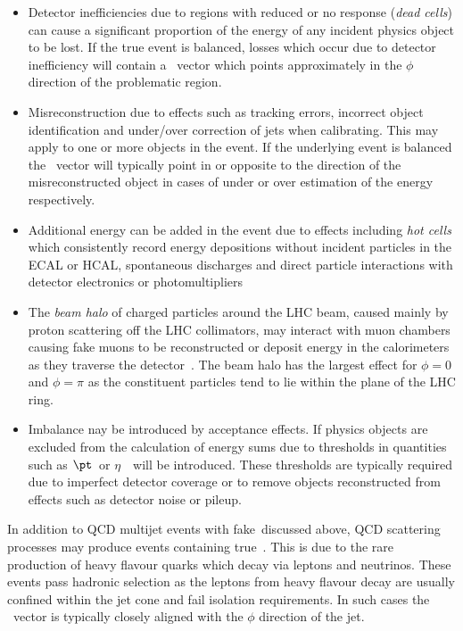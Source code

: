 \begin{itemize}
\item Detector inefficiencies due to regions with reduced or no response (\emph{dead cells}) can cause 
a significant proportion of the energy of any incident physics object to be lost. If the true event 
is balanced, losses which occur due to detector inefficiency will contain a \met~vector which points 
approximately in the $\phi$ direction of the problematic region.
\item Misreconstruction due to effects such as tracking errors, incorrect object identification and
under/over correction of jets when calibrating. This may apply to one or more objects in the event. 
If the underlying event is balanced the \met~vector will typically point in or opposite to the direction 
of the misreconstructed object in cases of under or over estimation of the energy respectively.
\item Additional energy can be added in the event due to effects including \emph{hot cells} which 
consistently record energy depositions without incident particles in the ECAL or HCAL, 
spontaneous discharges and direct particle interactions with detector
electronics or photomultipliers
\item The \emph{beam halo} of charged particles around the LHC beam, caused mainly 
by proton scattering off the LHC collimators, may interact with muon chambers causing fake muons to be 
reconstructed or deposit energy in the calorimeters as they traverse the detector~\cite{beam_halo}. The beam halo has the largest 
effect for $\phi = 0$ and $\phi=\pi$ as the constituent particles tend to lie within the plane of the LHC ring.
\item Imbalance nay be introduced by acceptance effects. If physics objects are excluded from the calculation
of energy sums due to thresholds in quantities such as $\pt$~or $\eta$~\met~will be introduced. These thresholds are typically 
required due to imperfect detector coverage or to remove objects reconstructed from effects such as detector 
noise or pileup.
\end{itemize}
In addition to QCD multijet events with fake~\met discussed above, QCD scattering processes 
may produce events containing true~\met. This is due to the rare production of heavy flavour 
quarks which decay via leptons and neutrinos. These events pass hadronic selection as the leptons from 
heavy flavour decay are usually confined within the jet cone and fail isolation requirements. 
In such cases the \met~vector is typically closely aligned with the $\phi$ direction of the jet.

